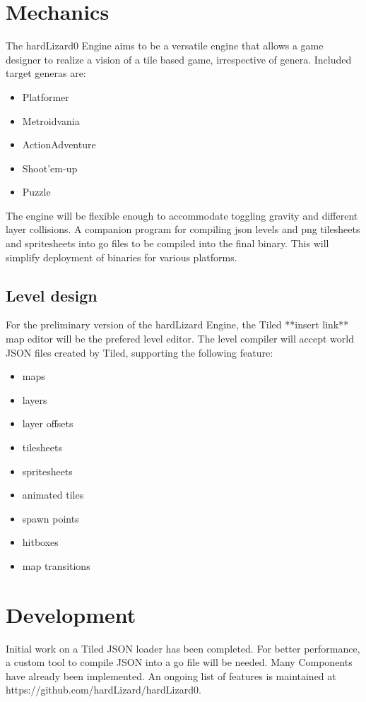 \documentclass[journal]{IEEEtran}
\begin{document}
\section{Mechanics}
The hardLizard0 Engine aims to be a versatile engine that allows a game designer to realize a vision of a tile based game, irrespective of genera.
Included target generas are:
\begin{itemize}
  \item Platformer
  \item Metroidvania
  \item ActionAdventure
  \item Shoot'em-up
  \item Puzzle
\end{itemize}

The engine will be flexible enough to accommodate toggling gravity and different layer collisions.
A companion program for compiling json levels and png tilesheets and spritesheets into go files to be compiled into the final binary.
This will simplify deployment of binaries for various platforms.

\subsection{Level design}
For the preliminary version of the hardLizard Engine, the Tiled **insert link** map editor will be the prefered level editor.
The level compiler will accept world JSON files created by Tiled, supporting the following feature:
\begin{itemize}
  \item maps
  \item layers
  \item layer offsets
  \item tilesheets
  \item spritesheets
  \item animated tiles
  \item spawn points
  \item hitboxes
  \item map transitions 
\end{itemize}

\section{Development}
Initial work on a Tiled JSON loader has been completed.
For better performance, a custom tool to compile JSON into a go file will be needed.
Many Components have already been implemented. An ongoing list of features is maintained at https://github.com/hardLizard/hardLizard0.
\end{document}
